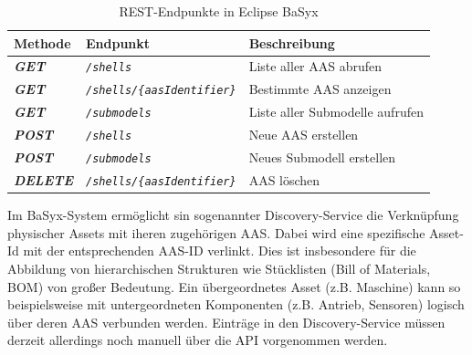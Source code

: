 \vspace{1em}
\begin{table}[htbp]
    \centering
    \begin{tabular}{l l l}
        \toprule
        \textbf{Methode} & \textbf{Endpunkt} & \textbf{Beschreibung} \\
        \toprule
        \textbf{\textcolor{green!50!black}{\textit{GET}}}     & \texttt{\textit{/shells}} & Liste aller AAS abrufen \\
        \textbf{\textcolor{green!50!black}{\textit{GET}}}     & \texttt{\textit{/shells/\{aasIdentifier\}}} & Bestimmte AAS anzeigen \\
        \textbf{\textcolor{green!50!black}{\textit{GET}}}     & \texttt{\textit{/submodels}} & Liste aller Submodelle aufrufen \\
        \textbf{\textcolor{orange!85!black}{\textit{POST}}}    & \texttt{\textit{/shells}} & Neue AAS erstellen \\
        \textbf{\textcolor{orange!85!black}{\textit{POST}}}    & \texttt{\textit{/submodels}} & Neues Submodell erstellen \\
        \textbf{\textcolor{red!80!black}{\textit{DELETE}}}  & \texttt{\textit{/shells/\{aasIdentifier\}}} & AAS löschen \\
        \midrule
    \end{tabular}
    \caption{REST-Endpunkte in Eclipse BaSyx}
    \label{tab:aas_endpoints}
\end{table}

Im BaSyx-System ermöglicht sin sogenannter Discovery-Service die Verknüpfung physischer Assets mit iheren zugehörigen AAS.
Dabei wird eine spezifische Asset-Id mit der entsprechenden AAS-ID verlinkt.
Dies ist insbesondere für die Abbildung von hierarchischen Strukturen wie Stücklisten (Bill of Materials, BOM) von großer Bedeutung.
Ein übergeordnetes Asset (z.B. Maschine) kann so beispielsweise mit untergeordneten Komponenten (z.B. Antrieb, Sensoren) logisch über deren AAS verbunden werden.
Einträge in den Discovery-Service müssen derzeit allerdings noch manuell über die API vorgenommen werden.

